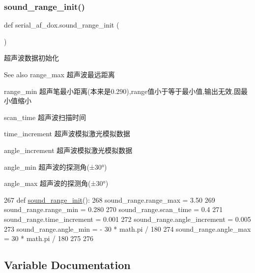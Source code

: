 \mbox{\label{namespaceserial__af__dox_ad1c876b11fde1e1df850b6ee76536042}} 
\subsubsection{\texorpdfstring{sound\+\_\+range\+\_\+init()}{sound\_range\_init()}}
{\footnotesize\ttfamily def serial\+\_\+af\+\_\+dox.\+sound\+\_\+range\+\_\+init (\begin{DoxyParamCaption}{ }\end{DoxyParamCaption})}



超声波数据初始化 

\begin{DoxySeeAlso}{See also}
range\+\_\+max 超声波最远距离 

range\+\_\+min 超声笔最小距离(本来是0.290),range值小于等于最小值,输出无效,固最小值缩小 

scan\+\_\+time 超声波扫描时间 

time\+\_\+increment 超声波模拟激光模拟数据 

angle\+\_\+increment 超声波模拟激光模拟数据 

angle\+\_\+min 超声波的探测角(±30°) 

angle\+\_\+max 超声波的探测角(±30°) 
\end{DoxySeeAlso}

\begin{DoxyCode}
267 \textcolor{keyword}{def }\hyperlink{namespaceserial__af__dox_ad1c876b11fde1e1df850b6ee76536042}{sound\_range\_init}():
268     sound\_range.range\_max = 3.50
269     sound\_range.range\_min = 0.280
270     sound\_range.scan\_time = 0.4
271     sound\_range.time\_increment = 0.001
272     sound\_range.angle\_increment = 0.005
273     sound\_range.angle\_min = - 30 * math.pi / 180
274     sound\_range.angle\_max = 30 * math.pi / 180
275 
276 
\end{DoxyCode}


\subsection{Variable Documentation}
\mbox{\label{namespaceserial__af__dox_ae0cff17238b33224c937e9cd91d8a9e4}} 
